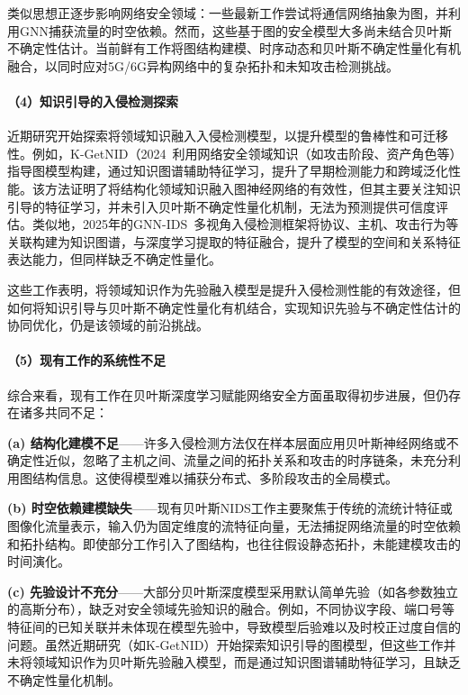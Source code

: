 类似思想正逐步影响网络安全领域：一些最新工作尝试将通信网络抽象为图，并利用GNN捕获流量的时空依赖。然而，这些基于图的安全模型大多尚未结合贝叶斯不确定性估计。当前鲜有工作将图结构建模、时序动态和贝叶斯不确定性量化有机融合，以同时应对5G/6G异构网络中的复杂拓扑和未知攻击检测挑战。

\paragraph{（4）知识引导的入侵检测探索}

近期研究开始探索将领域知识融入入侵检测模型，以提升模型的鲁棒性和可迁移性。例如，K-GetNID（2024~\cite{Wang2024KGetNID}利用网络安全领域知识（如攻击阶段、资产角色等）指导图模型构建，通过知识图谱辅助特征学习，提升了早期检测能力和跨域泛化性能。该方法证明了将结构化领域知识融入图神经网络的有效性，但其主要关注知识引导的特征学习，并未引入贝叶斯不确定性量化机制，无法为预测提供可信度评估。类似地，2025年的GNN-IDS~\cite{sun2024gnnids}多视角入侵检测框架将协议、主机、攻击行为等关联构建为知识图谱，与深度学习提取的特征融合，提升了模型的空间和关系特征表达能力，但同样缺乏不确定性量化。

这些工作表明，将领域知识作为先验融入模型是提升入侵检测性能的有效途径，但如何将知识引导与贝叶斯不确定性量化有机结合，实现知识先验与不确定性估计的协同优化，仍是该领域的前沿挑战。

\paragraph{（5）现有工作的系统性不足}

综合来看，现有工作在贝叶斯深度学习赋能网络安全方面虽取得初步进展，但仍存在诸多共同不足：

\textbf{(a) 结构化建模不足}——许多入侵检测方法仅在样本层面应用贝叶斯神经网络或不确定性近似，忽略了主机之间、流量之间的拓扑关系和攻击的时序链条，未充分利用图结构信息。这使得模型难以捕获分布式、多阶段攻击的全局模式。

\textbf{(b) 时空依赖建模缺失}——现有贝叶斯NIDS工作主要聚焦于传统的流统计特征或图像化流量表示，输入仍为固定维度的流特征向量，无法捕捉网络流量的时空依赖和拓扑结构。即使部分工作引入了图结构，也往往假设静态拓扑，未能建模攻击的时间演化。

\textbf{(c) 先验设计不充分}——大部分贝叶斯深度模型采用默认简单先验（如各参数独立的高斯分布），缺乏对安全领域先验知识的融合。例如，不同协议字段、端口号等特征间的已知关联并未体现在模型先验中，导致模型后验难以及时校正过度自信的问题。虽然近期研究（如K-GetNID）开始探索知识引导的图模型，但这些工作并未将领域知识作为贝叶斯先验融入模型，而是通过知识图谱辅助特征学习，且缺乏不确定性量化机制。

